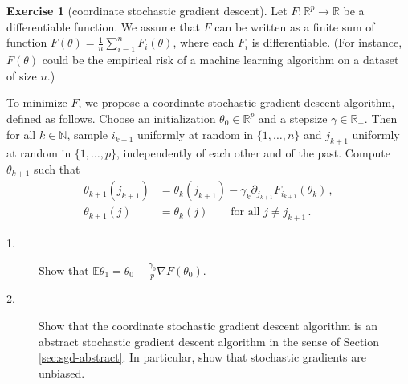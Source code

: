 \documentclass[11pt,reqno]{article}
\newcommand{\N}{\mathbb{N}}
\newcommand{\E}{\mathbb{E}}
\newcommand{\R}{\mathbb{R}}
\numberwithin{equation}{section}
\theoremstyle{plain}
\theoremstyle{definition}
\newtheorem{exercice}[assumption]{Exercise}
\theoremstyle{remark}
\begin{document}
\begin{exercice}[coordinate stochastic gradient descent]
	Let $F:\R^p \to \R$ be a differentiable function. We assume that $F$ can be written as a finite sum of function $F(\theta) = \frac{1}{n} \sum_{i=1}^n F_i(\theta)$, where each $F_i$ is differentiable. (For instance, $F(\theta)$ could be the empirical risk of a machine learning algorithm on a dataset of size $n$.) 
	
	To minimize $F$, we propose a coordinate stochastic gradient descent algorithm, defined as follows. Choose an initialization $\theta_0 \in \R^p$ and a stepsize $\gamma \in \R_+$. Then for all $k \in \N$, sample $i_{k+1}$ uniformly at random in $\{1, \dots, n\}$ and $j_{k+1}$ uniformly at random in $\{1,\dots, p\}$, independently of each other and of the past. Compute $\theta_{k+1}$ such that 
	\begin{align*}
		\theta_{k+1}(j_{k+1}) &= \theta_k(j_{k+1}) - \gamma_k \partial_{j_{k+1}} F_{i_{k+1}}(\theta_k)  \, , \\
		\theta_{k+1}(j) &= \theta_k(j) \qquad \text{for all } j \neq j_{k+1} \, .
	\end{align*}
	\begin{description}
		\item[1.] Show that $\E \theta_1 = \theta_0 - \frac{\gamma_0}{p} \nabla F(\theta_0)$.
		\item[2.] Show that the coordinate stochastic gradient descent algorithm is an abstract stochastic gradient descent algorithm in the sense of Section \ref{sec:sgd-abstract}. In particular, show that stochastic gradients are unbiased.
	\end{description}
\end{exercice}
\end{document}
